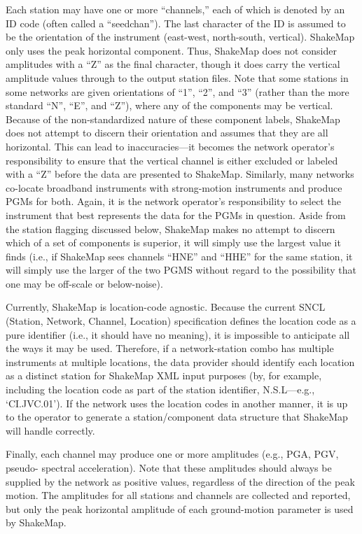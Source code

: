 \documentclass[letterpaper,10pt,english]{sphinxmanual}
\begin{document}
Each station may have one or more “channels,” each of which is denoted by an ID code
(often called a “seedchan”). The last character of the ID is assumed to be the orientation
of the instrument (east-west, north-south, vertical). ShakeMap only
uses the peak horizontal component. Thus, ShakeMap does not consider amplitudes with a “Z” as the
final character, though it does carry the vertical amplitude
values through to the output station files. Note that some
stations in some networks are given orientations of “1”, “2”, and “3” (rather than the more
standard “N”, “E”, and “Z”), where any of the components may be vertical. Because of the
non-standardized nature of these component labels, ShakeMap does not attempt to
discern their orientation and assumes that they are all horizontal. This can lead to inaccuracies---it becomes the network operator's responsibility to ensure that the vertical channel
is either excluded or labeled with a “Z” before the data are presented to ShakeMap.
Similarly, many networks co-locate broadband instruments with strong-motion
instruments and produce PGMs for both. Again, it is the network operator's responsibility
to select the instrument that best represents the data for the PGMs in question. Aside from
the station flagging discussed below, ShakeMap makes no attempt to discern which of a
set of components is superior, it will simply use the largest value it finds (i.e., if
ShakeMap sees channels “HNE” and “HHE” for the same station, it will simply use the
larger of the two PGMS without regard to the possibility that one may be off-scale or
below-noise).

Currently, ShakeMap is location-code agnostic. Because the current SNCL (Station,
Network, Channel, Location) specification defines the location code as a pure identifier
(i.e., it should have no meaning), it is impossible to anticipate all the ways it may be used.
Therefore, if a network-station combo has multiple instruments at multiple locations, the
data provider should identify each location as a distinct station for ShakeMap XML input
purposes (by, for example, including the location code as part of the station identifier,
N.S.L---e.g., `CI.JVC.01'). If the network uses the location codes in another manner, it is
up to the operator to generate a station/component data structure that ShakeMap will
handle correctly.

Finally, each channel may produce one or more amplitudes (e.g., PGA, PGV, pseudo-
spectral acceleration). Note that these amplitudes should always be supplied by the
network as positive values, regardless of the direction of the peak motion. The amplitudes
for all stations and channels are collected and reported, but only the peak horizontal
amplitude of each ground-motion parameter is used by ShakeMap.
\end{document}
